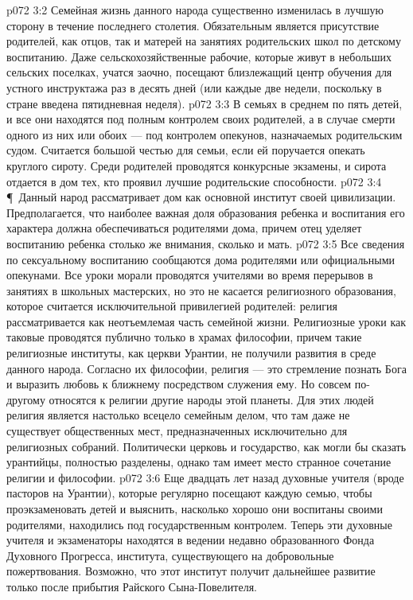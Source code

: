 \vs p072 3:2 Семейная жизнь данного народа существенно изменилась в лучшую сторону в течение последнего столетия. Обязательным является присутствие родителей, как отцов, так и матерей на занятиях родительских школ по детскому воспитанию. Даже сельскохозяйственные рабочие, которые живут в небольших сельских поселках, учатся заочно, посещают близлежащий центр обучения для устного инструктажа раз в десять дней (или каждые две недели, поскольку в стране введена пятидневная неделя).
\vs p072 3:3 В семьях в среднем по пять детей, и все они находятся под полным контролем своих родителей, а в случае смерти одного из них или обоих --- под контролем опекунов, назначаемых родительским судом. Считается большой честью для семьи, если ей поручается опекать круглого сироту. Среди родителей проводятся конкурсные экзамены, и сирота отдается в дом тех, кто проявил лучшие родительские способности.
\vs p072 3:4 \P\ Данный народ рассматривает дом как основной институт своей цивилизации. Предполагается, что наиболее важная доля образования ребенка и воспитания его характера должна обеспечиваться родителями дома, причем отец уделяет воспитанию ребенка столько же внимания, сколько и мать.
\vs p072 3:5 Все сведения по сексуальному воспитанию сообщаются дома родителями или официальными опекунами. Все уроки морали проводятся учителями во время перерывов в занятиях в школьных мастерских, но это не касается религиозного образования, которое считается исключительной привилегией родителей: религия рассматривается как неотъемлемая часть семейной жизни. Религиозные уроки как таковые проводятся публично только в храмах философии, причем такие религиозные институты, как церкви Урантии, не получили развития в среде данного народа. Согласно их философии, религия --- это стремление познать Бога и выразить любовь к ближнему посредством служения ему. Но совсем по\hyp{}другому относятся к религии другие народы этой планеты. Для этих людей религия является настолько всецело семейным делом, что там даже не существует общественных мест, предназначенных исключительно для религиозных собраний. Политически церковь и государство, как могли бы сказать урантийцы, полностью разделены, однако там имеет место странное сочетание религии и философии.
\vs p072 3:6 Еще двадцать лет назад духовные учителя (вроде пасторов на Урантии), которые регулярно посещают каждую семью, чтобы проэкзаменовать детей и выяснить, насколько хорошо они воспитаны своими родителями, находились под государственным контролем. Теперь эти духовные учителя и экзаменаторы находятся в ведении недавно образованного Фонда Духовного Прогресса, института, существующего на добровольные пожертвования. Возможно, что этот институт получит дальнейшее развитие только после прибытия Райского Сына\hyp{}Повелителя.
